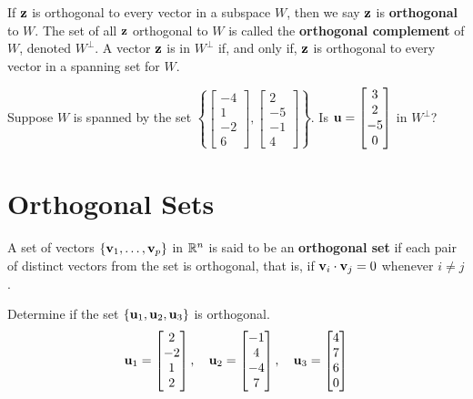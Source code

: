 \begin{boxdef}
	If $\boldsymbol{\mathbf{z}}$ is orthogonal to every vector in a subspace $W$, then we say $\boldsymbol{\mathbf{z}}$ is \textbf{orthogonal} to $W$. The set of all $\boldsymbol{\mathbf{z}}$ orthogonal to $W$ is called the \textbf{orthogonal complement} of $W$, denoted $W^\perp$. A vector $\boldsymbol{\mathbf{z}}$ is in $W^\perp$ if, and only if, $\boldsymbol{\mathbf{z}}$ is orthogonal to every vector in a spanning set for $W$.
\end{boxdef}

\begin{exercise} %
	Suppose $W$ is spanned by the set $\left\{ \begin{bmatrix}-4\\1\\-2\\6\end{bmatrix},\begin{bmatrix}2\\-5\\-1\\4\end{bmatrix} \right\}$. Is $\boldsymbol{\mathbf{u}}=\begin{bmatrix}3\\2\\-5\\0\end{bmatrix}$ in $W^\perp$?
\end{exercise}
\vfill


\newpage


\section{Orthogonal Sets}
\name

\begin{boxme}
	A set of vectors $\{\boldsymbol{\mathbf{v}}_1,\ldots,\boldsymbol{\mathbf{v}}_p\}$ in $\mathbb{R}^n$ is said to be an \textbf{orthogonal set} if each pair of distinct vectors from the set is orthogonal, that is, if $\boldsymbol{\mathbf{v}}_i\cdot\boldsymbol{\mathbf{v}}_j=0$ whenever $i\neq j$.
\end{boxme}


\begin{exercise} %
	Determine if the set $\{\boldsymbol{\mathbf{u}}_1,\boldsymbol{\mathbf{u}}_2,\boldsymbol{\mathbf{u}}_3\}$ is orthogonal.
	$$ \boldsymbol{\mathbf{u}}_1 = \begin{bmatrix}2\\-2\\1\\2\end{bmatrix}, \quad
	\boldsymbol{\mathbf{u}}_2 = \begin{bmatrix}-1\\4\\-4\\7\end{bmatrix}, \quad
	\boldsymbol{\mathbf{u}}_3 = \begin{bmatrix}4\\7\\6\\0\end{bmatrix} $$
\end{exercise}
\vfill


